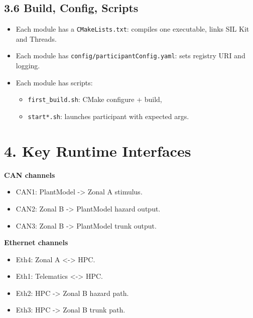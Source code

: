 \documentclass[11pt,a4paper]{article}
\begin{document}
\subsection*{3.6 Build, Config, Scripts}
\begin{itemize}
  \item Each module has a \texttt{CMakeLists.txt}: compiles one executable, links SIL Kit and Threads.
  \item Each module has \texttt{config/participantConfig.yaml}: sets registry URI and logging.
  \item Each module has scripts:
  \begin{itemize}
    \item \texttt{first\_build.sh}: CMake configure + build,
    \item \texttt{start*.sh}: launches participant with expected args.
  \end{itemize}
\end{itemize}

\section*{4. Key Runtime Interfaces}
\textbf{CAN channels}
\begin{itemize}
  \item CAN1: PlantModel -> Zonal A stimulus.
  \item CAN2: Zonal B -> PlantModel hazard output.
  \item CAN3: Zonal B -> PlantModel trunk output.
\end{itemize}

\textbf{Ethernet channels}
\begin{itemize}
  \item Eth4: Zonal A <-> HPC.
  \item Eth1: Telematics <-> HPC.
  \item Eth2: HPC -> Zonal B hazard path.
  \item Eth3: HPC -> Zonal B trunk path.
\end{itemize}
\end{document}
